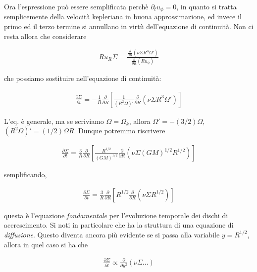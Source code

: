 \documentclass{report}
\begin{document}
Ora l'espressione può essere semplificata perchè \(\partial_t u_\phi = 0\), in quanto si tratta semplicemente della velocità kepleriana in buona approssimazione, ed invece il primo ed il terzo termine si annullano in virtù dell'equazione di continuità. Non ci resta allora che considerare

\begin{align}
    R u_R \Sigma = \frac{\frac{\partial }{\partial R}(\nu\Sigma R^3 \Omega')}{\frac{\partial }{\partial R}(Ru_\phi)}
\end{align}


che possiamo sostituire nell'equazione di continuità: 

\begin{align}
    \frac{\partial \Sigma}{\partial t} = -\frac{1}{R}\frac{\partial }{\partial R}\left[\frac{1}{(R^2\Omega)'}\frac{\partial}{\partial R}(\nu \Sigma R^3 \Omega')\right]
\end{align}

L'eq. è generale, ma se scriviamo \(\Omega = \Omega_k\), allora \(\Omega' = -(3/2)\Omega\), \((R^2\Omega)' = (1/2)\Omega R\). Dunque potremmo riscrivere

\begin{align}
    \frac{\partial \Sigma}{\partial t} = \frac{3}{R}\frac{\partial }{\partial R}\left[\frac{R^{1/2}}{(GM)^{1/2}}\frac{\partial }{\partial R}(\nu\Sigma (GM)^{1/2}R^{1/2})\right]
\end{align}

semplificando, 

\begin{tcolorbox}[colback=myg!15, colframe=black, boxrule=1pt]
\begin{align}
    \label{eq:evolution_disk}
    \frac{\partial \Sigma}{\partial t} = \frac{3}{R}\frac{\partial }{\partial R}\left[R^{1/2}\frac{\partial }{\partial R}(\nu \Sigma R^{1/2})\right]
\end{align}
\end{tcolorbox}

questa è l'equazione \emph{fondamentale} per l'evoluzione temporale dei dischi di accrescimento. Si noti in particolare che ha la struttura di una equazione di \emph{diffusione}. Questo diventa ancora più evidente se si passa alla variabile \(y = R^{1/2}\), allora in quel caso si ha che 

\begin{align}
    \frac{\partial \Sigma}{\partial t} \propto \frac{\partial}{\partial y^2}(\nu \Sigma \ldots )
\end{align}
\end{document}
